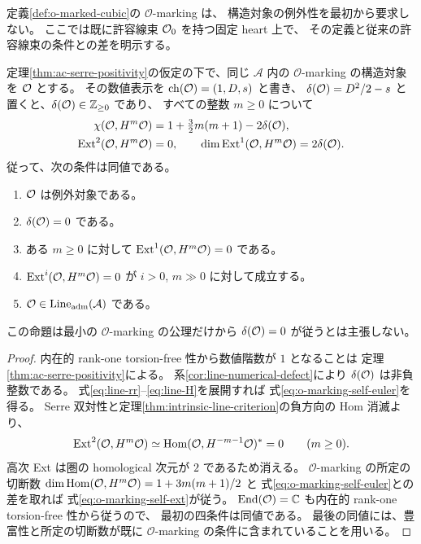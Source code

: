 定義\ref{def:o-marked-cubic}の $\mathcal O$-marking は、
構造対象の例外性を最初から要求しない。
ここでは既に許容線束 $\mathcal O_0$ を持つ固定 heart 上で、
その定義と従来の許容線束の条件との差を明示する。

\begin{proposition}[構造対象候補の自己拡大と例外的部分]
\label{prop:o-marking-defect-comparison}
定理\ref{thm:ac-serre-positivity}の仮定の下で、同じ $\mathcal A$ 内の
$\mathcal O$-marking の構造対象を $\mathcal O$ とする。
その数値表示を $\operatorname{ch}(\mathcal O)=(1,D,s)$ と書き、
$\delta(\mathcal O)=D^2/2-s$ と置くと、$\delta(\mathcal O)\in\mathbb Z_{\ge0}$ であり、
すべての整数 $m\ge0$ について
\begin{align}
 \chi(\mathcal O,H^m\mathcal O)
 &=1+\tfrac32m(m+1)-2\delta(\mathcal O),
 \label{eq:o-marking-self-euler}\\
 \operatorname{Ext}^2(\mathcal O,H^m\mathcal O)&=0,\qquad
 \dim\operatorname{Ext}^1(\mathcal O,H^m\mathcal O)=2\delta(\mathcal O).
 \label{eq:o-marking-self-ext}
\end{align}
従って、次の条件は同値である。
\begin{enumerate}
\item $\mathcal O$ は例外対象である。
\item $\delta(\mathcal O)=0$ である。
\item ある $m\ge0$ に対して $\operatorname{Ext}^1(\mathcal O,H^m\mathcal O)=0$ である。
\item $\operatorname{Ext}^i(\mathcal O,H^m\mathcal O)=0$ が $i>0$, $m\gg0$ に対して成立する。
\item $\mathcal O\in\operatorname{Line}_{\rm adm}(\mathcal A)$ である。
\end{enumerate}
この命題は最小の $\mathcal O$-marking の公理だけから
$\delta(\mathcal O)=0$ が従うとは主張しない。
\end{proposition}
\begin{proof}
内在的 rank-one torsion-free 性から数値階数が $1$ となることは
定理\ref{thm:ac-serre-positivity}による。
系\ref{cor:line-numerical-defect}により $\delta(\mathcal O)$ は非負整数である。
式\eqref{eq:line-rr}--\eqref{eq:line-H}を展開すれば
式\eqref{eq:o-marking-self-euler}を得る。
Serre 双対性と定理\ref{thm:intrinsic-line-criterion}の負方向の Hom 消滅より、
\[
 \operatorname{Ext}^2(\mathcal O,H^m\mathcal O)
 \simeq\operatorname{Hom}(\mathcal O,H^{-m-1}\mathcal O)^*=0
 \qquad(m\ge0).
\]
高次 Ext は圏の homological 次元が $2$ であるため消える。
$\mathcal O$-marking の所定の切断数
$\dim\operatorname{Hom}(\mathcal O,H^m\mathcal O)=1+3m(m+1)/2$ と
式\eqref{eq:o-marking-self-euler}との差を取れば
式\eqref{eq:o-marking-self-ext}が従う。
$\operatorname{End}(\mathcal O)=\mathbb C$ も内在的 rank-one torsion-free 性から従うので、
最初の四条件は同値である。
最後の同値には、豊富性と所定の切断数が既に
$\mathcal O$-marking の条件に含まれていることを用いる。
\end{proof}

